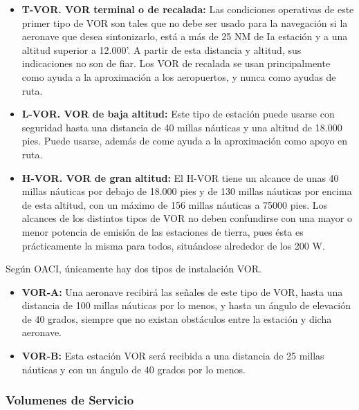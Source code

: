 \begin{itemize}
\item \textbf{T-VOR. VOR terminal o de recalada:} Las condiciones operativas de este primer tipo de VOR son tales que no debe ser usado para la navegación si la aeronave que desea sintonizarlo, está a más de 25 NM de Ia estación y a una altitud superior a 12.000'. A partir de esta distancia y altitud, sus indicaciones no son de fiar.
Los VOR de recalada se usan principalmente como ayuda a la aproximación a los aeropuertos, y nunca como ayudas de ruta.


\item \textbf{L-VOR. VOR de baja altitud:}  Este tipo de estación puede usarse con seguridad hasta una distancia de 40 millas náuticas y una altitud de 18.000 pies. Puede usarse, además de come ayuda a la aproximación como apoyo en ruta.


\item \textbf{H-VOR. VOR de gran altitud:} El H-VOR tiene un alcance de unas 40 millas náuticas por debajo de 18.000 pies y de 130 millas náuticas por encima de esta altitud, con un máximo de 156 millas náuticas a  75000 pies. Los alcances de los distintos tipos de VOR no deben confundirse con una mayor o menor potencia de emisión de las estaciones de tierra, pues ésta es prácticamente la misma para todos, situándose alrededor de los 200 W. 

\end{itemize}

Según OACI, únicamente hay dos tipos de instalación VOR. 

\begin{itemize}
\item \textbf{VOR-A:} Una aeronave recibirá las señales de este tipo de VOR, hasta una distancia de 100 millas náuticas por lo menos, y hasta un ángulo de elevación de 40 grados, siempre que no existan obstáculos entre la estación y dicha aeronave.

\item \textbf{VOR-B:} Esta estación VOR será recibida a una distancia de 25 millas náuticas y con un ángulo de 40 grados por lo menos.

\end{itemize}

\subsubsection{Volumenes de Servicio}
\label{sec:volumenes.de.servicio}

